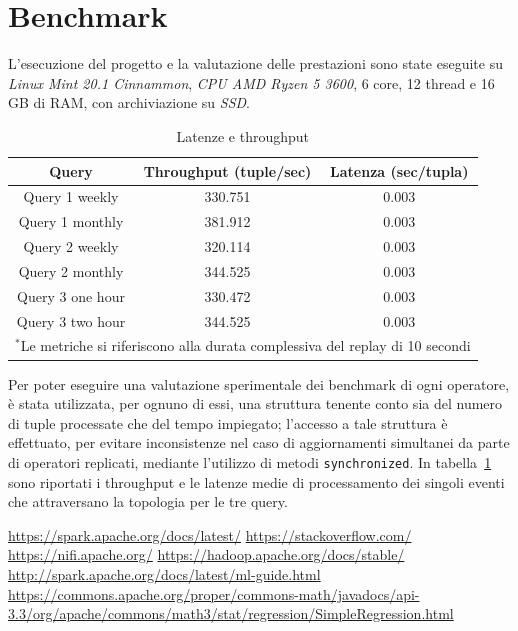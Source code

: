 \documentclass[conference]{IEEEtran}
\begin{document}
\section{\textbf{Benchmark}}
L'esecuzione del progetto e la valutazione delle prestazioni sono state eseguite su \emph{Linux Mint 20.1 Cinnammon}, \emph{CPU AMD Ryzen 5 3600}, 6 core, 12 thread e 16 GB di RAM, con archiviazione su \emph{SSD}. \\
\begin{table}[htbp]
\caption{Latenze e throughput}
\begin{center}
    \begin{tabular}{|c|c|c|}
    \hline
    \textbf{Query} & \textbf{Throughput (tuple/sec)} & \textbf{Latenza (sec/tupla)}  \\ \hline
    Query 1 weekly & 330.751 & 0.003  \\ \hline
    Query 1 monthly & 381.912 & 0.003  \\ \hline
    Query 2 weekly & 320.114 & 0.003  \\ \hline
    Query 2 monthly & 344.525 & 0.003  \\ \hline
    Query 3 one hour & 330.472 & 0.003  \\ \hline
    Query 3 two hour & 344.525 & 0.003  \\ \hline
    \multicolumn{3}{l}{$^{\mathrm{*}}$Le metriche si riferiscono alla durata complessiva del replay di 10 secondi}
    \end{tabular}
\label{tab1}
\end{center}
\end{table}
\par Per poter eseguire una valutazione sperimentale dei
benchmark di ogni operatore, \`{e} stata utilizzata, per ognuno
di essi, una struttura tenente conto sia del numero di tuple
processate che del tempo impiegato; l'accesso a tale
struttura \`{e} effettuato, per evitare inconsistenze nel caso di
aggiornamenti simultanei da parte di operatori replicati,
mediante l’utilizzo di metodi \texttt{​synchronized​}.
In tabella~\ref{tab1} sono riportati i throughput e le latenze medie di processamento dei singoli eventi che attraversano la topologia per le tre query. 

\begin{thebibliography}{00}
 \url{https://spark.apache.org/docs/latest/}
 \url{https://stackoverflow.com/}
 \url{https://nifi.apache.org/}
 \url{https://hadoop.apache.org/docs/stable/}
 \url{http://spark.apache.org/docs/latest/ml-guide.html}
 \url{https://commons.apache.org/proper/commons-math/javadocs/api-3.3/org/apache/commons/math3/stat/regression/SimpleRegression.html}
\end{thebibliography}
\end{document}
